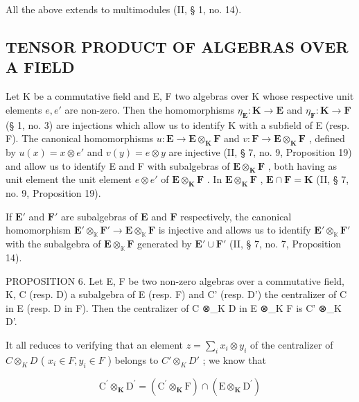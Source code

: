 All the above extends to multimodules (II, § 1, no. 14).

\subsection{TENSOR PRODUCT OF ALGEBRAS OVER A FIELD}

Let K be a commutative field and E, F two algebras over K whose respective unit elements \(e, e'\) are non-zero. Then the homomorphisms \(\eta_{\mathbf{E}}: \mathbf{K} \to \mathbf{E}\) and \(\eta_{\mathbf{F}}: \mathbf{K} \to \mathbf{F}\) (§ 1, no. 3) are injections which allow us to identify K with a subfield of E (resp. F). The canonical homomorphisms \(u: \mathbf{E} \to \mathbf{E} \otimes_{\mathbf{K}} \mathbf{F}\) and \(v: \mathbf{F} \to \mathbf{E} \otimes_{\mathbf{K}} \mathbf{F}\) , defined by \(u(x) = x \otimes e'\) and \(v(y) = e \otimes y\) are injective (II, § 7, no. 9, Proposition 19) and allow us to identify E and F with subalgebras of \(\mathbf{E} \otimes_{\mathbf{K}} \mathbf{F}\) , both having as unit element the unit element \(e \otimes e'\) of \(\mathbf{E} \otimes_{\mathbf{K}} \mathbf{F}\) . In \(\mathbf{E} \otimes_{\mathbf{K}} \mathbf{F}\) , \(\mathbf{E} \cap \mathbf{F} = \mathbf{K}\) (II, § 7, no. 9, Proposition 19).

If \(\mathbf{E}'\) and \(\mathbf{F}'\) are subalgebras of \(\mathbf{E}\) and \(\mathbf{F}\) respectively, the canonical homomorphism \(\mathbf{E}' \otimes_{\mathbb{K}} \mathbf{F}' \to \mathbf{E} \otimes_{\mathbb{K}} \mathbf{F}\) is injective and allows us to identify \(\mathbf{E}' \otimes_{\mathbb{K}} \mathbf{F}'\) with the subalgebra of \(\mathbf{E} \otimes_{\mathbb{K}} \mathbf{F}\) generated by \(\mathbf{E}' \cup \mathbf{F}'\) (II, § 7, no. 7, Proposition 14).

PROPOSITION 6. Let E, F be two non-zero algebras over a commutative field, K, C (resp. D) a subalgebra of E (resp. F) and C' (resp. D') the centralizer of C in E (resp. D in F). Then the centralizer of C ⊗\_K D in E ⊗\_K F is C' ⊗\_K D'.

It all reduces to verifying that an element \(z = \sum_{i} x_{i} \otimes y_{i}\) of the centralizer of \(C \otimes_{K} D\) ( \(x_{i} \in F, y_{i} \in F\) ) belongs to \(C' \otimes_{K} D'\) ; we know that

\[
\mathrm{C} ^ {\prime} \otimes_ {\mathbf {K}} \mathrm{D} ^ {\prime} = (\mathrm{C} ^ {\prime} \otimes_ {\mathbf {K}} \mathrm{F}) \cap (\mathrm{E} \otimes_ {\mathbf {K}} \mathrm{D} ^ {\prime})
\]


